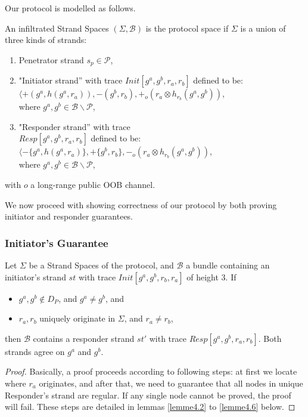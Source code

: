 Our protocol is modelled as follows. 

\begin{Definition}
An infiltrated Strand Spaces $(\Sigma,\mathcal{B})$ is the protocol space if $\Sigma$ is a union of three kinds of strands:
\begin{enumerate}
\item Penetrator strand $s_p \in \mathcal{P}$,
\item "Initiator strand'' with trace {\small $Init[g^a,g^b,r_a,r_b]$} defined to be: \\ 
 {\small $\langle +(g^a,h(g^a,r_a)),-(g^b,r_b),+_o(r_a \otimes h_{r_b}(g^a,g^b))$, \\ where $g^a,g^b \in \mathcal{B} \backslash \mathcal{P}$,}
\item "Responder strand'' with trace\\
 {\small $Resp[g^a,g^b,r_a,r_b]$} defined to be: \\ 
 {\small $\langle -\{g^a,h(g^a,r_a)\},+\{g^b,r_b\}, -_o(r_a \otimes h_{r_b}(g^a,g^b))$, \\ where $g^a,g^b \in \mathcal{B} \backslash \mathcal{P}$,}
\end{enumerate}
with $o$ a long-range public OOB channel.
\end{Definition}

We now proceed with showing correctness of our protocol by both proving initiator and responder guarantees.

\subsubsection{Initiator's Guarantee}

\begin{Proposition}
Let $\Sigma$ be a Strand Spaces of the protocol, and $\mathcal{B}$ a bundle containing an initiator's strand $st$ with trace $Init[g^a,g^b,r_b,r_a]$ of height 3. If
 \begin{itemize}
 \item $g^a,g^b \not\in D_P$, and $g^a \not= g^b$, and
 \item $r_a,r_b$ uniquely originate in $\Sigma$, and $r_a \not= r_b$,
 \end{itemize}
then $\mathcal{B}$ contains a responder strand $st'$ with trace $Resp[g^a,g^b,r_a,r_b]$. Both strands agree on $g^a$ and $g^b$.
\end{Proposition}

\begin{proof}
Basically, a proof proceeds according to following steps: at first we locate where $r_a$ originates, and after that, we need to guarantee that all nodes in unique Responder's strand are regular.
 If any single node cannot be proved, the proof will fail. 
These steps are detailed in lemmas \ref{lemme4.2} to \ref{lemme4.6} below.
\end{proof}


